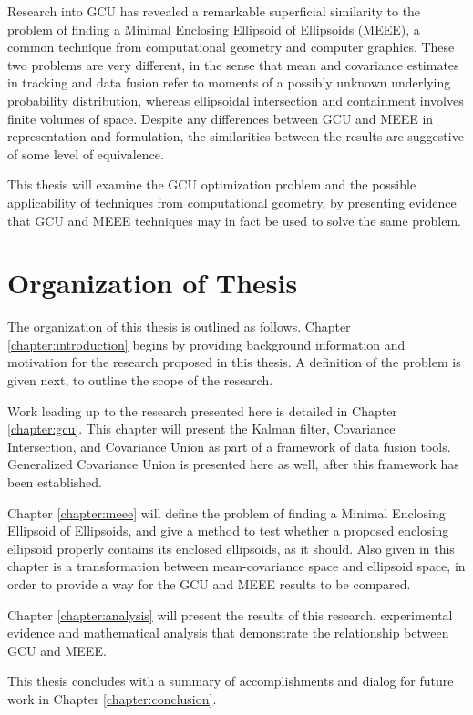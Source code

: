 Research into GCU has revealed a remarkable superficial similarity to the problem of finding a Minimal Enclosing
Ellipsoid of Ellipsoids (MEEE), a common technique from computational geometry and computer graphics. These two problems
are very different, in the sense that mean and covariance estimates in tracking and data fusion refer to moments of a
possibly unknown underlying probability distribution, whereas ellipsoidal intersection and containment involves finite
volumes of space. Despite any differences between GCU and MEEE in representation and formulation, the similarities
between the results are suggestive of some level of equivalence.

This thesis will examine the GCU optimization problem and the possible applicability of techniques from computational
geometry, by presenting evidence that GCU and MEEE techniques may in fact be used to solve the same problem.


\section{Organization of Thesis}


The organization of this thesis is outlined as follows. Chapter \ref{chapter:introduction} begins by providing background
information and motivation for the research proposed in this thesis. A definition of the problem is given next, to
outline the scope of the research.

Work leading up to the research presented here is detailed in Chapter \ref{chapter:gcu}. This chapter will present the
Kalman filter, Covariance Intersection, and Covariance Union as part of a framework of data fusion tools. Generalized
Covariance Union is presented here as well, after this framework has been established.

Chapter \ref{chapter:meee} will define the problem of finding a Minimal Enclosing Ellipsoid of Ellipsoids, and give a
method to test whether a proposed enclosing ellipsoid properly contains its enclosed ellipsoids, as it should. Also given
in this chapter is a transformation between mean-covariance space and ellipsoid space, in order to provide a way for the
GCU and MEEE results to be compared.

Chapter \ref{chapter:analysis} will present the results of this research, experimental evidence and mathematical
analysis that demonstrate the relationship between GCU and MEEE.

This thesis concludes with a summary of accomplishments and dialog for future work in Chapter
\ref{chapter:conclusion}.



